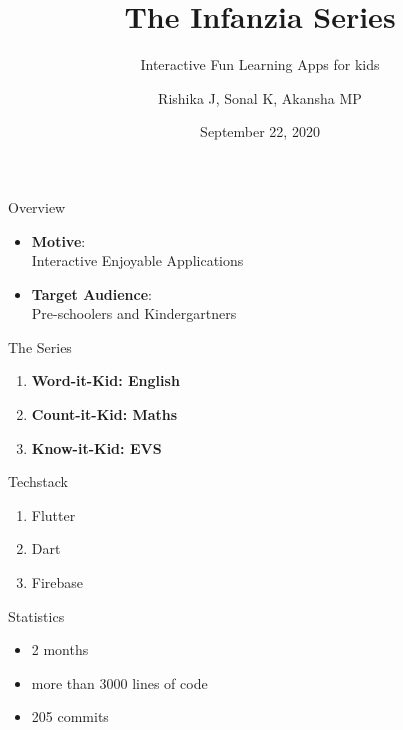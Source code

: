 \documentclass[14pt]{beamer}
\title[Infanzia]{The Infanzia Series}
\subtitle{Interactive Fun Learning Apps for kids}
\author[Team 16]{Rishika J, Sonal K, Akansha MP}
\date{September 22, 2020}
\begin{document}
\begin{frame}
    \titlepage
\end{frame}


\begin{frame}{Overview}
    \pause
    \begin{itemize}
    \item \textbf{Motive}: \\
            Interactive Enjoyable Applications
        \pause
    \item \textbf{Target Audience}: \\
            Pre-schoolers and Kindergartners
    \end{itemize}
\end{frame}


\begin{frame}[standout]
    \alert{The Series}
\end{frame}


\begin{frame}
    \begin{enumerate}
        \item \textbf{Word-it-Kid: English} \\
    \pause
        \item \textbf{Count-it-Kid: Maths} \\
    \pause
        \item \textbf{Know-it-Kid: EVS} 
    \end{enumerate}
\end{frame}


\begin{frame}{Techstack}
    \pause
    \begin{enumerate}
        \item Flutter
    \pause
        \item Dart
    \pause
        \item Firebase  
    \end{enumerate}
\end{frame}


\begin{frame}{Statistics}
    \pause
    \begin{itemize}
        \item 2 months
            \pause
        \item more than 3000 lines of code
            \pause
        \item 205 commits
    \end{itemize}
\end{frame}
\end{document}
